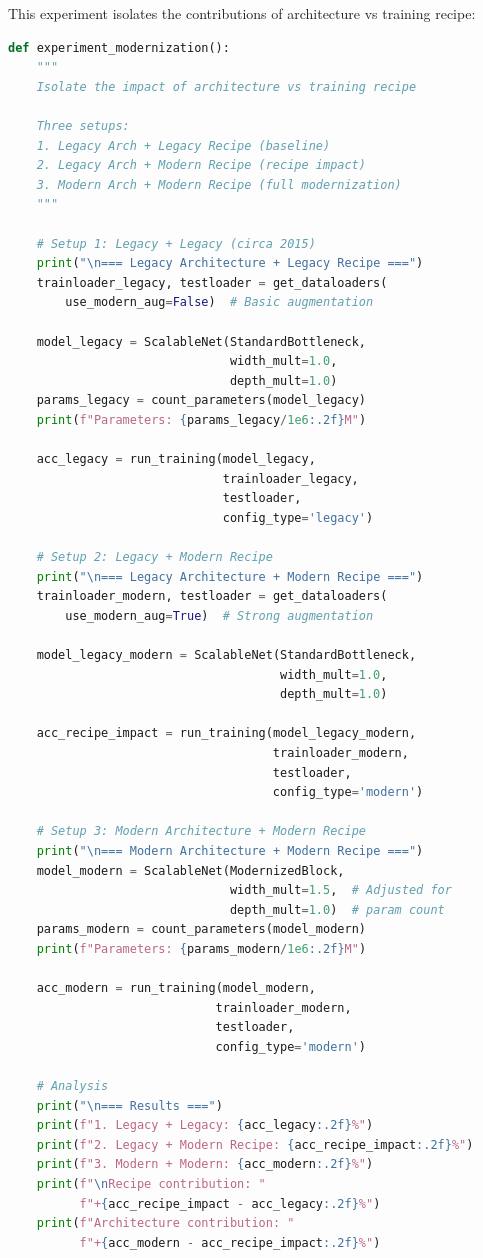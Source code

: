 \documentclass{article}
\begin{document}
This experiment isolates the contributions of architecture vs training recipe:

\begin{lstlisting}[language=Python, caption=Modernization Experiment]
def experiment_modernization():
    """
    Isolate the impact of architecture vs training recipe
    
    Three setups:
    1. Legacy Arch + Legacy Recipe (baseline)
    2. Legacy Arch + Modern Recipe (recipe impact)
    3. Modern Arch + Modern Recipe (full modernization)
    """
    
    # Setup 1: Legacy + Legacy (circa 2015)
    print("\n=== Legacy Architecture + Legacy Recipe ===")
    trainloader_legacy, testloader = get_dataloaders(
        use_modern_aug=False)  # Basic augmentation
    
    model_legacy = ScalableNet(StandardBottleneck,
                               width_mult=1.0, 
                               depth_mult=1.0)
    params_legacy = count_parameters(model_legacy)
    print(f"Parameters: {params_legacy/1e6:.2f}M")
    
    acc_legacy = run_training(model_legacy, 
                              trainloader_legacy,
                              testloader,
                              config_type='legacy')
    
    # Setup 2: Legacy + Modern Recipe
    print("\n=== Legacy Architecture + Modern Recipe ===")
    trainloader_modern, testloader = get_dataloaders(
        use_modern_aug=True)  # Strong augmentation
    
    model_legacy_modern = ScalableNet(StandardBottleneck,
                                      width_mult=1.0,
                                      depth_mult=1.0)
    
    acc_recipe_impact = run_training(model_legacy_modern,
                                     trainloader_modern,
                                     testloader,
                                     config_type='modern')
    
    # Setup 3: Modern Architecture + Modern Recipe
    print("\n=== Modern Architecture + Modern Recipe ===")
    model_modern = ScalableNet(ModernizedBlock,
                               width_mult=1.5,  # Adjusted for 
                               depth_mult=1.0)  # param count
    params_modern = count_parameters(model_modern)
    print(f"Parameters: {params_modern/1e6:.2f}M")
    
    acc_modern = run_training(model_modern,
                             trainloader_modern,
                             testloader,
                             config_type='modern')
    
    # Analysis
    print("\n=== Results ===")
    print(f"1. Legacy + Legacy: {acc_legacy:.2f}%")
    print(f"2. Legacy + Modern Recipe: {acc_recipe_impact:.2f}%")
    print(f"3. Modern + Modern: {acc_modern:.2f}%")
    print(f"\nRecipe contribution: "
          f"+{acc_recipe_impact - acc_legacy:.2f}%")
    print(f"Architecture contribution: "
          f"+{acc_modern - acc_recipe_impact:.2f}%")
\end{lstlisting}
\end{document}
